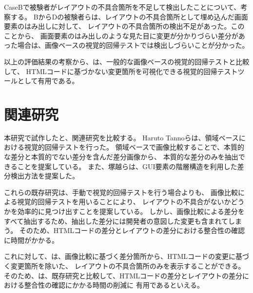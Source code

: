 CaseBで被験者がレイアウトの不具合箇所を不足して検出したことについて、考察する。
BからDの被験者らは、レイアウトの不具合箇所として埋め込んだ画面要素のはみ出しに対して、
レイアウトの不具合箇所の検出不足があった。このことから、
画面要素のはみ出しのような見た目に変更が分かりづらい差分があった場合は、画像ベースの視覚的回帰テストでは検出しづらいことが分かった。

以上の評価結果の考察から、\toolName は、一般的な画像ベースの視覚的回帰テストと比較して、
HTMLコードに基づかない変更箇所を可視化できる視覚的回帰テストツールとして有用である。

\section{関連研究}\label{sec:relation_research}
本研究で試作した\toolName と、関連研究を比較する。
Haruto Tannoらは、領域ベースにおける視覚的回帰テストを行った\cite{RegionDetect}。
領域ベースで画像比較することで、本質的な差分と本質的でない差分を含んだ差分画像から、
本質的な差分のみを抽出できることを提案している。
また、塚越らは、GUI要素の階層構造を利用した差分検出方法を提案した\cite{GuiRetrExternal}。
\par
これらの既存研究は、手動で視覚的回帰テストを行う場合よりも、
画像比較による視覚的回帰テストを用いることにより、
レイアウトの不具合がないかどうかを効率的に見つけ出すことを提案している。
しかし、画像比較による差分をすべて抽出するため、抽出した差分には開発者の意図した変更も含まれてしまう。
そのため、HTMLコードの差分とレイアウトの差分における整合性の確認に時間がかかる。

これに対して、\toolName は、画像比較に基づく差分箇所から、HTMLコードの変更に基づく変更箇所を除いた、
レイアウトの不具合箇所のみを表示することができる。
そのため、\toolName は、既存研究と比較して、HTMLコードの差分とレイアウトの差分における整合性の確認にかかる時間の削減に
有用であるといえる。

